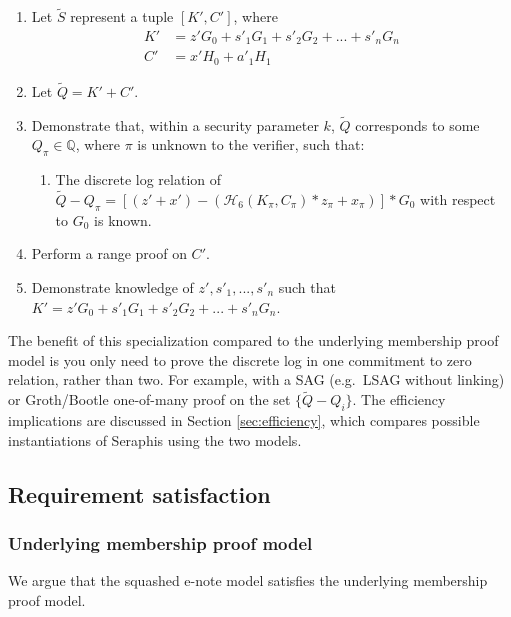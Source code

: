\begin{appendices}
\begin{enumerate}
    \item Let $\tilde{S}$ represent a tuple $[K', C']$, where\vspace{.115cm}
    \begin{align*}
        K' &= z' G_0 + s'_1 G_1 + s'_2 G_2 + ... + s'_n G_n \\
        C' &= x' H_0 + a'_1 H_1
    \end{align*}

    \item Let $\tilde{Q} = K' + C'$.

    \item Demonstrate that, within a security parameter $k$, $\tilde{Q}$ corresponds to some $Q_{\pi} \in \mathbb{Q}$, where $\pi$ is unknown to the verifier, such that:
    \begin{enumerate}
        \item The discrete log relation of $\tilde{Q} - Q_{\pi} = [(z' + x') - (\mathcal{H}_6(K_{\pi}, C_{\pi})*z_{\pi} + x_{\pi})]*G_0$ with respect to $G_0$ is known.
    \end{enumerate}

    \item Perform a range proof on $C'$.

    \item Demonstrate knowledge of $z', s'_1,...,s'_n$ such that $K' = z' G_0 + s'_1 G_1 + s'_2 G_2 + ... + s'_n G_n$.
\end{enumerate}

The benefit of this specialization compared to the underlying membership proof model is you only need to prove the discrete log in one commitment to zero relation, rather than two. For example, with a SAG (e.g.\ LSAG \cite{Liu2004} without linking) or Groth/Bootle one-of-many proof on the set $\{\tilde{Q} - Q_i\}$. The efficiency implications are discussed in Section \ref{sec:efficiency}, which compares possible instantiations of Seraphis using the two models.


\subsection{Requirement satisfaction}
\label{appendix:squashed-e-note-model-req-satisfaction}

\subsubsection{Underlying membership proof model}

We argue that the squashed e-note model satisfies the underlying membership proof model.


\end{appendices}
